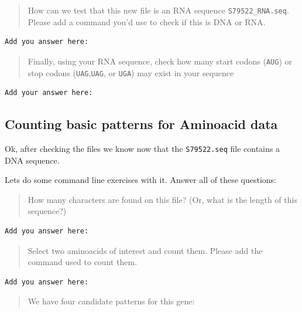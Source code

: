 \documentclass[
]{book}
\begin{document}
\begin{quote}
How can we test that this new file is an RNA sequence \texttt{S79522\_RNA.seq}. Please add a command you'd use to check if this is DNA or RNA.
\end{quote}

\begin{verbatim}
Add you answer here:

\end{verbatim}

\begin{quote}
Finally, using your RNA sequence, check how many start codons (\texttt{AUG}) or stop codons (\texttt{UAG},\texttt{UAG}, or \texttt{UGA}) may exist in your sequence
\end{quote}

\begin{verbatim}
Add your answer here:
\end{verbatim}

\hypertarget{counting-basic-patterns-for-aminoacid-data}{%
\subsection{Counting basic patterns for Aminoacid data}\label{counting-basic-patterns-for-aminoacid-data}}

Ok, after checking the files we know now that the \texttt{S79522.seq} file contains a DNA sequence.

Lets do some command line exercises with it. Answer all of these questions:

\begin{quote}
How many characters are found on this file? (Or, what is the length of this sequence?)
\end{quote}

\begin{verbatim}
Add you answer here:

\end{verbatim}

\begin{quote}
Select two aminoacids of interest and count them. Please add the command used to count them.
\end{quote}

\begin{verbatim}
Add you answer here:

\end{verbatim}

\begin{quote}
We have four candidate patterns for this gene:
\end{quote}
\end{document}
